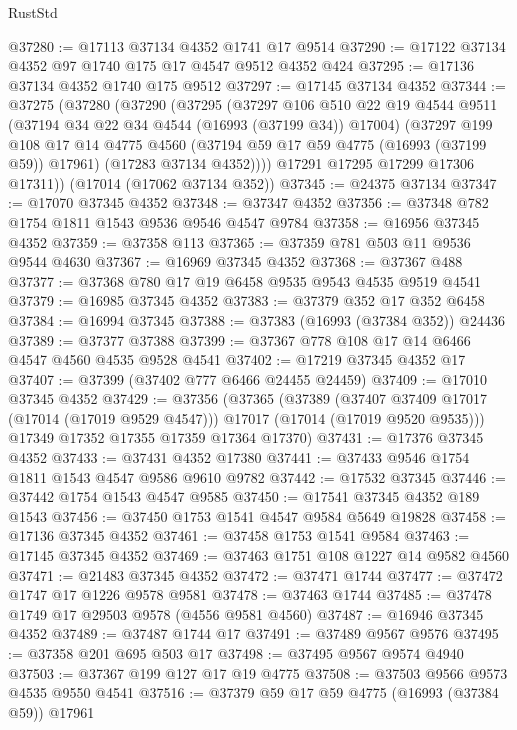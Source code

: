 \begin{lexlean}{RustStd}
\begin{coremodule}
@37280 := @17113 @37134 @4352 @1741 @17 @9514
@37290 := @17122 @37134 @4352 @97 @1740 @175 @17 @4547 @9512 @4352 @424
@37295 := @17136 @37134 @4352 @1740 @175 @9512
@37297 := @17145 @37134 @4352
@37344 := @37275
    (@37280
      (@37290
        (@37295
          (@37297
            @106
            @510
            @22
            @19
            @4544
            @9511
            (@37194 @34 @22 @34 @4544 (@16993 (@37199 @34)) @17004)
            (@37297
              @199
              @108
              @17
              @14
              @4775
              @4560
              (@37194 @59 @17 @59 @4775 (@16993 (@37199 @59)) @17961)
              (@17283 @37134 @4352))))
        @17291
        @17295
        @17299
        @17306
        @17311))
    (@17014 (@17062 @37134 @352))
@37345 := @24375 @37134
@37347 := @17070 @37345 @4352
@37348 := @37347 @4352
@37356 := @37348 @782 @1754 @1811 @1543 @9536 @9546 @4547 @9784
@37358 := @16956 @37345 @4352
@37359 := @37358 @113
@37365 := @37359 @781 @503 @11 @9536 @9544 @4630
@37367 := @16969 @37345 @4352
@37368 := @37367 @488
@37377 := @37368 @780 @17 @19 @6458 @9535 @9543 @4535 @9519 @4541
@37379 := @16985 @37345 @4352
@37383 := @37379 @352 @17 @352 @6458
@37384 := @16994 @37345
@37388 := @37383 (@16993 (@37384 @352)) @24436
@37389 := @37377 @37388
@37399 := @37367 @778 @108 @17 @14 @6466 @4547 @4560 @4535 @9528 @4541
@37402 := @17219 @37345 @4352 @17
@37407 := @37399 (@37402 @777 @6466 @24455 @24459)
@37409 := @17010 @37345 @4352
@37429 := @37356
    (@37365
      (@37389
        (@37407 @37409 @17017 (@17014 (@17019 @9529 @4547)))
        @17017
        (@17014 (@17019 @9520 @9535)))
      @17349
      @17352
      @17355
      @17359
      @17364
      @17370)
@37431 := @17376 @37345 @4352
@37433 := @37431 @4352 @17380
@37441 := @37433 @9546 @1754 @1811 @1543 @4547 @9586 @9610 @9782
@37442 := @17532 @37345
@37446 := @37442 @1754 @1543 @4547 @9585
@37450 := @17541 @37345 @4352 @189 @1543
@37456 := @37450 @1753 @1541 @4547 @9584 @5649 @19828
@37458 := @17136 @37345 @4352
@37461 := @37458 @1753 @1541 @9584
@37463 := @17145 @37345 @4352
@37469 := @37463 @1751 @108 @1227 @14 @9582 @4560
@37471 := @21483 @37345 @4352
@37472 := @37471 @1744
@37477 := @37472 @1747 @17 @1226 @9578 @9581
@37478 := @37463 @1744
@37485 := @37478 @1749 @17 @29503 @9578 (@4556 @9581 @4560)
@37487 := @16946 @37345 @4352
@37489 := @37487 @1744 @17
@37491 := @37489 @9567 @9576
@37495 := @37358 @201 @695 @503 @17
@37498 := @37495 @9567 @9574 @4940
@37503 := @37367 @199 @127 @17 @19 @4775
@37508 := @37503 @9566 @9573 @4535 @9550 @4541
@37516 := @37379 @59 @17 @59 @4775 (@16993 (@37384 @59)) @17961

\end{coremodule}
\end{lexlean}
